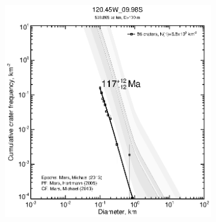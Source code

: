 \documentclass[12pt,letter]{article}
\begin{document}
\begin{figure}[h]
\begin{subfigure}{.33\textwidth}
\end{subfigure}
\begin{subfigure}{.33\textwidth}
  \includegraphics[width=\linewidth,clip,trim=1cm 1cm 1.5cm 1cm]{figures/craterstats/120-45W_09-98S_100m_cum.eps}
\end{subfigure}
\end{figure}
\end{document}
